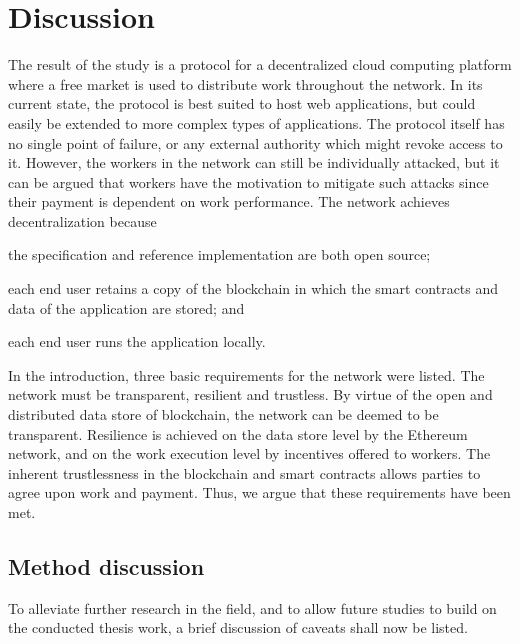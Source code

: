 \chapter{Discussion}
The result of the study is a protocol for a decentralized cloud computing platform where a free market is used to distribute work throughout the network. In its current state, the protocol is best suited to host web applications, but could easily be extended to more complex types of applications. The protocol itself has no single point of failure, or any external authority which might revoke access to it. However, the workers in the network can still be individually attacked, but it can be argued that workers have the motivation to mitigate such attacks since their payment is dependent on work performance.
The network achieves decentralization because
\begin{inparaenum}
\item the specification and reference implementation are both open source;
\item each end user retains a copy of the blockchain in which the smart contracts and data of the application are stored; and
\item each end user runs the application locally. 
\end{inparaenum}

In the introduction, three basic requirements for the network were listed. The network must be transparent, resilient and trustless. By virtue of the open and distributed data store of blockchain, the network can be deemed to be transparent. Resilience is achieved on the data store level by the Ethereum network, and on the work execution level by incentives offered to workers. The inherent trustlessness in the blockchain and smart contracts allows parties to agree upon work and payment. Thus, we argue that these requirements have been met.

\section{Method discussion}
To alleviate further research in the field, and to allow future studies to build on the conducted thesis work, a brief discussion of caveats shall now be listed.

